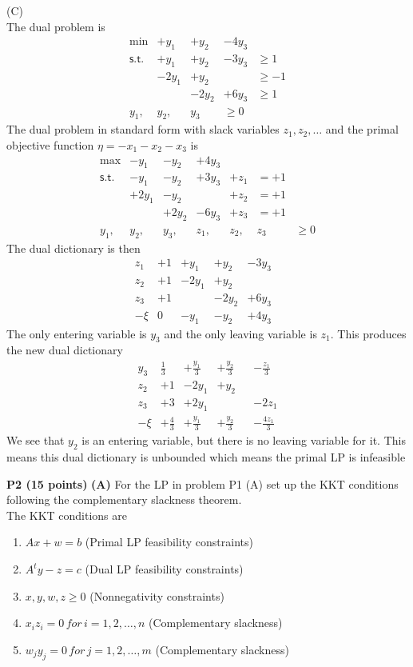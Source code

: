\documentclass[11pt]{article}
\begin{document}
\medskip

\noindent (C)
\\
The dual problem is
\[\begin{array}{rllllll}
\min & +y_1 & +y_2 & -4y_3 \\
\mathsf{s.t.}
& +y_1 & +y_2 & -3y_3 & \geq 1 \\
& -2y_1 & +y_2 & & \geq -1 \\
& & -2y_2 & +6y_3 & \geq 1 \\
y_1, & y_2, & y_3 & \geq 0
\end{array}\]
The dual problem in standard form with slack variables $z_1, z_2, \ldots$ and the primal objective function $\eta = -x_1 - x_2 - x_3$ is
\[\begin{array}{rllllll}
\max & -y_1 & -y_2 & +4y_3 \\
\mathsf{s.t.}
& -y_1 & -y_2 & +3y_3 & +z_1 & = +1 \\
& +2y_1 & -y_2 & & +z_2 & = +1 \\
& & +2y_2 & -6y_3 & +z_3 & = +1 \\
y_1, & y_2, & y_3, & z_1, & z_2, & z_3 & \geq 0
\end{array}\]
The dual dictionary is then
\[\begin{array}{r|cccccccc}
z_1 & +1 & +y_1 & +y_2 & -3y_3 \\
z_2 & +1 & -2y_1 & +y_2 & & \\
z_3 & +1 & & -2y_2 & +6y_3 \\
\hline
-\xi & 0 & -y_1 & -y_2 & +4y_3
\end{array}\]
The only entering variable is $y_3$ and the only leaving variable is $z_1$.  This produces the new dual dictionary
\[\begin{array}{r|cccccccc}
y_3 & \frac{1}{3} & +\frac{y_1}{3} & +\frac{y_2}{3} & & -\frac{z_1}{3}\\
z_2 & +1 & -2y_1 & +y_2 & & \\
z_3 & +3 & +2y_1 & & & -2z_1 \\
\hline
-\xi & +\frac{4}{3} & +\frac{y_1}{3} & +\frac{y_2}{3} & & -\frac{4z_1}{3}
\end{array}\]
We see that $y_2$ is an entering variable, but there is no leaving variable for it.  This means this dual dictionary is unbounded which means the primal LP is infeasible
\bigskip


\noindent\textbf{P2 (15 points) }  \textbf{(A)} For the LP in problem P1 (A) set up the KKT conditions
following the complementary slackness theorem.
\\
The KKT conditions are
\begin{enumerate}
  \item $Ax + w = b$ (Primal LP feasibility constraints)
  \item $A^{t}y - z = c$ (Dual LP feasibility constraints)
  \item $x, y, w, z \geq 0$ (Nonnegativity constraints)
  \item $x_iz_i = 0 \, for \, i = 1,2,\ldots,n$ (Complementary slackness)
  \item $w_jy_j = 0 \, for \, j = 1,2,\ldots,m$ (Complementary slackness)
\end{enumerate}
\end{document}
